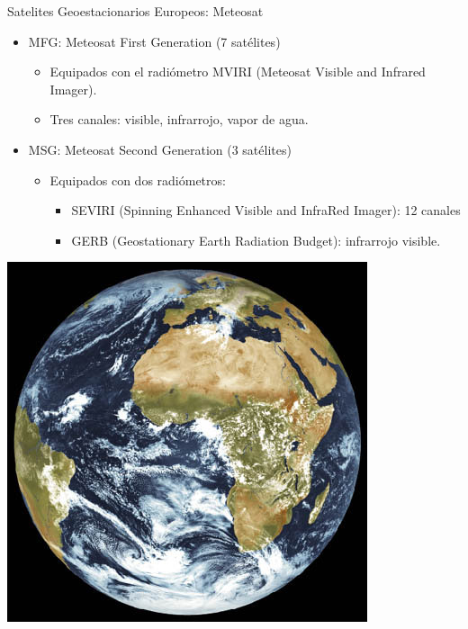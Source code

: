 \documentclass[xcolor={usenames,svgnames,dvipsnames}]{beamer}
\begin{document}
\begin{frame}[label={sec:org5c076d8}]{Satelites Geoestacionarios Europeos: Meteosat}
\begin{itemize}
\item \alert{MFG}: Meteosat First Generation (7 satélites)
\begin{itemize}
\item Equipados con el radiómetro MVIRI (Meteosat Visible and Infrared Imager).
\item Tres canales: visible, infrarrojo, vapor de agua.
\end{itemize}
\item \alert{MSG}: Meteosat Second Generation (3 satélites)
\begin{itemize}
\item Equipados con dos radiómetros:
\begin{itemize}
\item \alert{SEVIRI} (Spinning Enhanced Visible and InfraRed Imager): 12 canales
\item GERB (Geostationary Earth Radiation Budget): infrarrojo visible.
\end{itemize}
\end{itemize}
\end{itemize}

\begin{center}
\begin{center}
\includegraphics[height=0.3\textwidth]{../figs/Tierra_MSG.jpg}
\end{center}
\end{center}
\end{frame}
\end{document}
